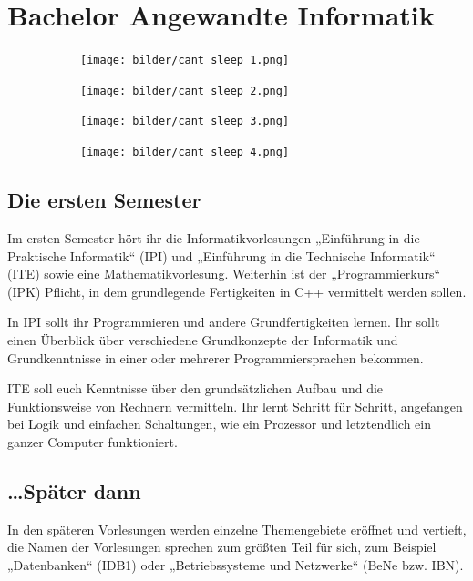 \section{Bachelor Angewandte Informatik}

\begin{figure}
    \centering
    \begin{subfigure}{.2\textwidth}
	    \texttt{[image: bilder/cant\_sleep\_1.png]}
    \end{subfigure}
    \begin{subfigure}{.2\textwidth}
	    \texttt{[image: bilder/cant\_sleep\_2.png]}
    \end{subfigure}
    \begin{subfigure}{.2\textwidth}
	    \texttt{[image: bilder/cant\_sleep\_3.png]}
    \end{subfigure}
    \begin{subfigure}{.2\textwidth}
	    \texttt{[image: bilder/cant\_sleep\_4.png]}
    \end{subfigure}
\end{figure}

\subsection{Die ersten Semester}

Im ersten Semester hört ihr die Informatikvorlesungen „Einführung in die Praktische Informatik“ (\gls{IPI}) und „Einführung in die Technische Informatik“ (\gls{ITE}) sowie eine Mathematikvorlesung. Weiterhin ist der „Programmierkurs“ (\gls{IPK}) Pflicht, in dem grundlegende Fertigkeiten in C++ vermittelt werden sollen.

In IPI sollt ihr Programmieren und andere Grundfertigkeiten lernen. Ihr sollt einen Überblick über verschiedene Grundkonzepte der Informatik und Grundkenntnisse in einer oder mehrerer Programmiersprachen bekommen.

ITE soll euch Kenntnisse über den grundsätzlichen Aufbau und die Funktionsweise von Rechnern vermitteln. Ihr lernt Schritt für Schritt, angefangen bei Logik und einfachen Schaltungen, wie ein Prozessor und letztendlich ein ganzer Computer funktioniert.


\subsection{\dots{}Später dann}

In den späteren Vorlesungen werden einzelne Themengebiete eröffnet und vertieft, die Namen der Vorlesungen sprechen zum größten Teil für sich, zum Beispiel „Datenbanken“ (\gls{IDB1}) oder „Betriebssysteme und Netzwerke“ (\gls{BeNe} bzw. IBN).

